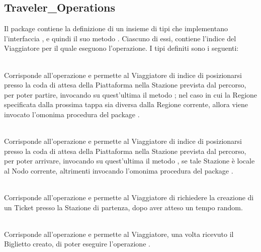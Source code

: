	\subsection{Traveler\_Operations}
	
	Il package  contiene la definizione di un insieme di tipi  che implementano l'interfaccia , e quindi il suo metodo . Ciascuno di essi, contiene l'indice del Viaggiatore  per il quale eseguono l'operazione. I tipi definiti sono i seguenti:
	
	\begin{description}
		
		\item {}\\
		Corrisponde all'operazione  e permette al Viaggiatore di indice  di posizionarsi presso la coda di attesa della Piattaforma nella Stazione prevista dal percorso, per poter partire, invocando su quest'ultima il metodo ; nel caso in cui la Regione specificata dalla prossima tappa sia diversa dalla Regione corrente, allora viene invocato l'omonima procedura del package .
		
		\item {}\\
		Corrisponde all'operazione  e permette al Viaggiatore di indice  di posizionarsi presso la coda di attesa della Piattaforma nella Stazione prevista dal percorso, per poter arrivare, invocando su quest'ultima il metodo , se tale Stazione è locale al Nodo corrente, altrimenti invocando l'omonima procedura del package .
		
		\item {}\\
		Corrisponde all'operazione  e permette al Viaggiatore di richiedere la creazione di un Ticket presso la Stazione di partenza, dopo aver atteso un tempo random.
		
		\item {}\\
		Corrisponde all'operazione  e permette al Viaggiatore, una volta ricevuto il Biglietto creato, di poter eseguire l'operazione . 
		 
	\end{description}
	
	
